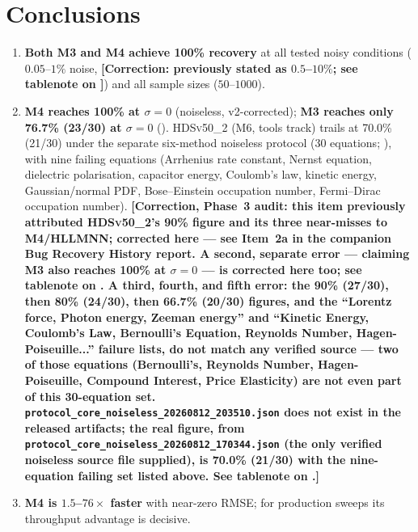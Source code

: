 \documentclass[twoside,11pt]{article}
\newcommand{\HSL}{\textsc{HLLMNN}}
\newcommand{\HDS}{\textsc{HDSv50\_2}}
\begin{document}
\section{Conclusions}
\label{sec:conclusions}

\begin{enumerate}
  \item \textbf{Both M3 and M4 achieve 100\% recovery} at all tested noisy
    conditions ($0.05$--$1\%$ noise, \textbf{[Correction: previously stated
    as $0.5$--$10\%$; see tablenote on ]}) and all
    sample sizes ($50$--$1000$).
  \item \textbf{M4 reaches 100\% at $\sigma=0$} (noiseless, v2-corrected);
    \textbf{M3 reaches only 76.7\% (23/30) at $\sigma=0$}
    (). \HDS{} (M6, tools track) trails at 70.0\% (21/30)
    under the separate six-method noiseless protocol (30 equations;
    ), with nine failing equations (Arrhenius rate
    constant, Nernst equation, dielectric polarisation, capacitor energy,
    Coulomb's law, kinetic energy, Gaussian/normal PDF, Bose--Einstein
    occupation number, Fermi--Dirac occupation number).
    \textbf{[Correction, Phase~3 audit: this item previously attributed
    \HDS's 90\% figure and its three near-misses to M4/\HSL; corrected
    here --- see Item~2a in the companion Bug Recovery History report.
    A second, separate error --- claiming M3 also reaches 100\% at
    $\sigma=0$ --- is corrected here too; see tablenote on
    . A third, fourth, and fifth error: the 90\%
    (27/30), then 80\% (24/30), then 66.7\% (20/30) figures, and the
    ``Lorentz force, Photon energy, Zeeman energy'' and ``Kinetic Energy,
    Coulomb's Law, Bernoulli's Equation, Reynolds Number,
    Hagen-Poiseuille...'' failure lists, do not match any verified
    source --- two of those equations (Bernoulli's, Reynolds Number,
    Hagen-Poiseuille, Compound Interest, Price Elasticity) are not even
    part of this 30-equation set.
    \texttt{protocol\_core\_noiseless\_20260812\_203510.json} does not
    exist in the released artifacts; the real figure, from
    \texttt{protocol\_core\_noiseless\_20260812\_170344.json} (the only
    verified noiseless source file supplied), is 70.0\% (21/30) with the
    nine-equation failing set listed above. See tablenote on
    .]}
  \item \textbf{M4 is $1.5$--$76\times$ faster} with near-zero RMSE; for
    production sweeps its throughput advantage is decisive.

\end{enumerate}
\end{document}
